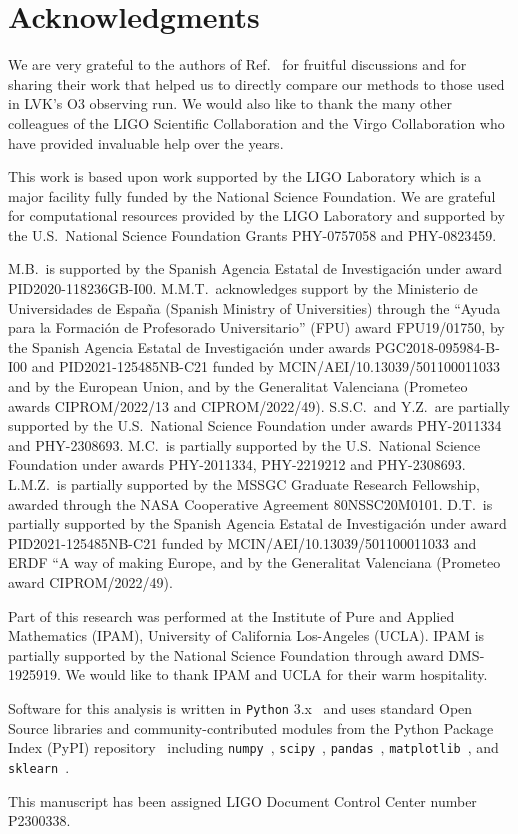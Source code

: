 \section*{Acknowledgments}

We are very grateful to the authors of Ref.~\cite{Chatterjee:2019avs} for fruitful discussions and for sharing their work that helped us to directly compare
our methods to those used in \ac{LVK}'s \ac{O3} observing run. We would also like to thank the many other colleagues of the LIGO Scientific Collaboration and
the Virgo Collaboration who have provided invaluable help over the years.

This work is based upon work supported by the LIGO Laboratory which is a major facility fully funded by the National Science Foundation. We are grateful for computational resources provided by
the LIGO Laboratory and supported by the U.S.\ National Science Foundation Grants PHY-0757058 and PHY-0823459. 

M.B.\ is supported by the Spanish Agencia Estatal de Investigaci\'on under award PID2020-118236GB-I00. M.M.T.\ acknowledges support by the Ministerio de Universidades de Espa\~na (Spanish
Ministry of Universities) through the ``Ayuda para la Formaci\'on de Profesorado Universitario'' (FPU) award FPU19/01750, by the Spanish Agencia Estatal de Investigaci\'on under awards
PGC2018-095984-B-I00 and PID2021-125485NB-C21 funded by MCIN/AEI/10.13039/501100011033 and by the European Union, and by the Generalitat Valenciana (Prometeo awards CIPROM/2022/13 and
CIPROM/2022/49). S.S.C.\ and Y.Z.\ are partially supported by the U.S.\ National Science Foundation under awards PHY-2011334 and PHY-2308693. M.C.\ is partially supported by the U.S.\ National
Science Foundation under awards PHY-2011334, PHY-2219212 and PHY-2308693. L.M.Z.\ is partially supported by the MSSGC Graduate Research Fellowship, awarded through the NASA Cooperative
Agreement 80NSSC20M0101. D.T.~is partially supported by the Spanish Agencia Estatal de Investigaci\'on under award PID2021-125485NB-C21 funded by MCIN/AEI/10.13039/501100011033 and ERDF ``A way
of making Europe, and by the Generalitat Valenciana (Prometeo award CIPROM/2022/49).

Part of this research was performed at the Institute of Pure and Applied Mathematics (IPAM),  University of California Los-Angeles (UCLA). IPAM is partially supported by the National Science
Foundation through award DMS-1925919. We would like to thank IPAM and UCLA for their warm hospitality. 

Software for this analysis is written in \texttt{Python} 3.x~\cite{python3} and uses standard Open Source libraries and community-contributed modules from the Python Package Index (PyPI)
repository~\cite{pypi} including \texttt{numpy}~\cite{harris2020array}, \texttt{scipy}~\cite{2020SciPy-NMeth}, \texttt{pandas}~\cite{reback2020pandas,mckinney-proc-scipy-2010},
\texttt{matplotlib}~\cite{Hunter:2007ouj}, and \texttt{sklearn}~\cite{scikit-learn}.

This manuscript has been assigned LIGO Document Control Center number P2300338.





